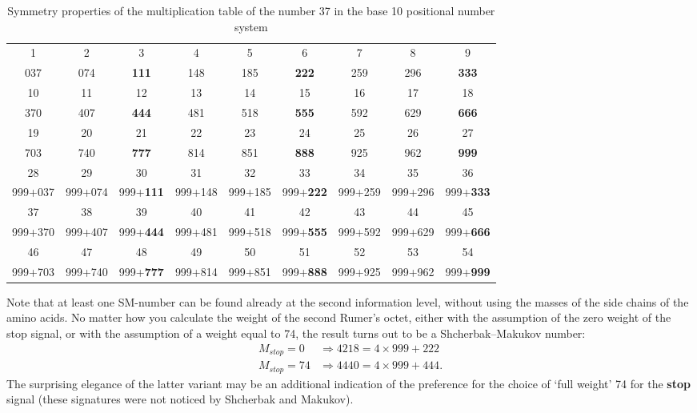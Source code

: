 \documentclass[12pt]{article}
\begin{document}
\begin{table}[htbp]
\centering
\caption{Symmetry properties of the multiplication table of the number 37 in the base 10 positional number system}
\label{tab:mult37}
\footnotesize
\begin{tabular}{|c|c|c|c|c|c|c|c|c|}
\hline
1 & 2 & 3 & 4 & 5 & 6 & 7 & 8 & 9 \\
037 & 074 & \textbf{111} & 148 & 185 & \textbf{222} & 259 & 296 & \textbf{333} \\
\hline
10 & 11 & 12 & 13 & 14 & 15 & 16 & 17 & 18 \\
370 & 407 & \textbf{444} & 481 & 518 & \textbf{555} & 592 & 629 & \textbf{666} \\
\hline
19 & 20 & 21 & 22 & 23 & 24 & 25 & 26 & 27 \\
703 & 740 & \textbf{777} & 814 & 851 & \textbf{888} & 925 & 962 & \textbf{999} \\
\hline
28 & 29 & 30 & 31 & 32 & 33 & 34 & 35 & 36 \\
999+037 & 999+074 & 999+\textbf{111} & 999+148 & 999+185 & 999+\textbf{222} & 999+259 & 999+296 & 999+\textbf{333} \\
\hline
37 & 38 & 39 & 40 & 41 & 42 & 43 & 44 & 45 \\
999+370 & 999+407 & 999+\textbf{444} & 999+481 & 999+518 & 999+\textbf{555} & 999+592 & 999+629 & 999+\textbf{666} \\
\hline
46 & 47 & 48 & 49 & 50 & 51 & 52 & 53 & 54 \\
999+703 & 999+740 & 999+\textbf{777} & 999+814 & 999+851 & 999+\textbf{888} & 999+925 & 999+962 & 999+\textbf{999} \\
\hline
\end{tabular}
\end{table}

Note that at least one SM-number can be found already at the second information level, without using the masses of the side chains of the amino acids. No matter how you calculate the weight of the second Rumer's octet, either with the assumption of the zero weight of the stop signal, or with the assumption of a weight equal to 74, the result turns out to be a Shcherbak--Makukov number:
\begin{align*}
M_{stop} = 0 &\Rightarrow 4218 = 4 \times 999 + 222 \\
M_{stop} = 74 &\Rightarrow 4440 = 4 \times 999 + 444.
\end{align*}
The surprising elegance of the latter variant may be an additional indication of the preference for the choice of `full weight' 74 for the \textbf{stop} signal (these signatures were not noticed by Shcherbak and Makukov).
\end{document}
